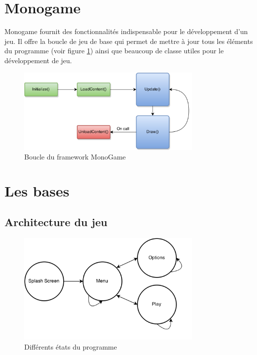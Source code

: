 \documentclass[11pt, a4paper, oneside]{report}
\begin{document}
\section{Monogame}
Monogame fournit des fonctionnalités indispensable pour le développement d'un jeu. Il offre la boucle de jeu de base qui permet de mettre à jour tous les éléments du programme (voir figure \ref{fig:loopmg}) ainsi que beaucoup de classe utiles pour le développement de jeu.
\begin{figure}[H]
	\begin{center}
	\includegraphics[width=0.8\textwidth]{loopmg}
	\caption{Boucle du framework MonoGame}
	\label{fig:loopmg}
	\end{center}
\end{figure}
\section{Les bases}
\subsection{Architecture du jeu}
\begin{figure}[H]
	\begin{center}
	\includegraphics[width=0.8\textwidth]{StatesOfProgram}
	\caption{Différents états du programme}
	\label{fig:StatesOfProgram}
	\end{center}
\end{figure}
\end{document}
